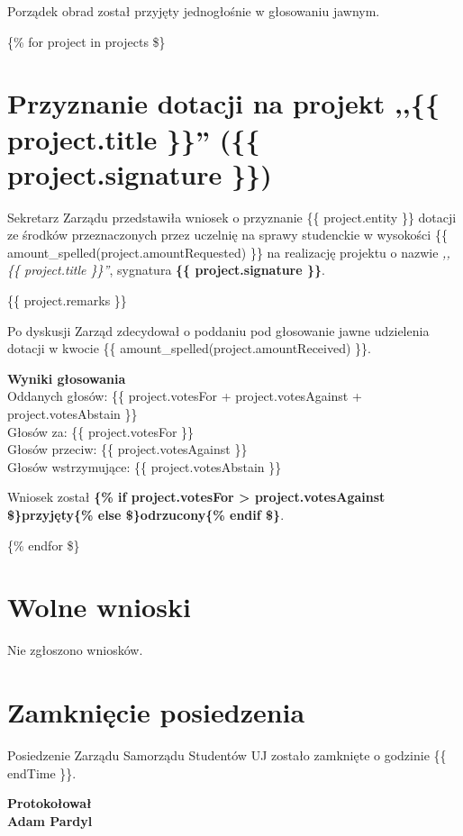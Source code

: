 \documentclass[10pt, a4paper]{article}
\newcommand{\VAR}[1]{\{\{ #1 \}\}}
\newcommand{\BLOCK}[1]{\{\% #1 \$\}}
\begin{document}
    Porządek obrad został przyjęty jednogłośnie w głosowaniu jawnym.


    \BLOCK{for project in projects}


    \section{Przyznanie dotacji na projekt ,,\VAR{project.title}'' (\VAR{project.signature})}

    Sekretarz Zarządu przedstawiła wniosek o przyznanie \VAR{project.entity} dotacji ze środków przeznaczonych przez uczelnię na sprawy studenckie w wysokości \VAR{amount_spelled(project.amountRequested)} na realizację projektu o nazwie \textit{,,\VAR{project.title}''}, sygnatura \textbf{\VAR{project.signature}}.

    \VAR{project.remarks}

    Po dyskusji Zarząd zdecydował o poddaniu pod głosowanie jawne udzielenia dotacji w kwocie \VAR{amount_spelled(project.amountReceived)}.

    \begin{center}
        \textbf{Wyniki głosowania}\smallskip\\
        Oddanych głosów: \VAR{project.votesFor + project.votesAgainst + project.votesAbstain}\\
        Głosów za: \VAR{project.votesFor}\\
        Głosów przeciw: \VAR{project.votesAgainst}\\
        Głosów wstrzymujące: \VAR{project.votesAbstain}
    \end{center}

    Wniosek został \textbf{\BLOCK{if project.votesFor > project.votesAgainst}przyjęty\BLOCK{else}odrzucony\BLOCK{endif}}.

    \BLOCK{endfor}


    \section{Wolne wnioski}

    Nie zgłoszono wniosków.


    \section{Zamknięcie posiedzenia}

    Posiedzenie Zarządu Samorządu Studentów UJ zostało zamknięte o godzinie \VAR{endTime}.

    \bigskip \bigskip
    \hfill\begin{minipage}{\dimexpr\textwidth-11cm}
    \begin{flushright}
    \textbf{
    Protokołował\\
    Adam Pardyl}
    \end{flushright}
    \end{minipage}
\end{document}
